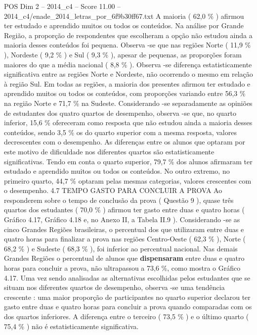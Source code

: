 \begin{textsample}{POS Dim 2 – 2014\_c4 – Score 11.00 – 2014\_c4/enade\_2014\_letras\_por\_6f9b30ff67.txt}
A maioria ( 62,0 \% ) afirmou ter estudado e aprendido muitos ou todos os conteúdos.
Na análise por Grande Região, a proporção de respondentes que escolheram a opção não estudou ainda a maioria desses conteúdos foi pequena.
Observa -se que nas regiões Norte ( 11,9 \% ), Nordeste ( 9,2 \% ) e Sul ( 9,3 \% ), apesar de pequenas, as proporções foram maiores do que a média nacional ( 8,8 \% ).
Observa -se diferença estatisticamente significativa entre as regiões Norte e Nordeste, não ocorrendo o mesmo em relação à região Sul.
Em todas as regiões, a maioria dos presentes afirmou ter estudado e aprendido muitos ou todos os conteúdos, com proporções variando entre 56,3 \% na região Norte e 71,7 \% na Sudeste.
Considerando -se separadamente as opiniões de estudantes dos quatro quartos de desempenho, observa -se que, no quarto inferior, 15,6 \% ofereceram como resposta que não estudou ainda a maioria desses conteúdos, sendo 3,5 \% os do quarto superior com a mesma resposta, valores decrescentes com o desempenho.
As diferenças entre os alunos que optaram por este motivo de dificuldade nos diferentes quartos são estatisticamente significativas.
Tendo em conta o quarto superior, 79,7 \% dos alunos afirmaram ter estudado e aprendido muitos ou todos os conteúdos.
No outro extremo, no primeiro quarto, 44,7 \% optaram pelas mesmas categorias, valores crescentes com o desempenho. 4.7 TEMPO GASTO PARA CONCLUIR A PROVA Ao responderem sobre o tempo de conclusão da prova ( Questão 9 ), quase três quartos dos estudantes ( 70,0 \% ) afirmou ter gasto entre duas e quatro horas ( Gráfico 4.17, Gráfico 4.18 e, no Anexo II, a Tabela II.9 ).
Considerando -se as cinco Grandes Regiões brasileiras, o percentual dos que utilizaram entre duas e quatro horas para finalizar a prova nas regiões Centro-Oeste ( 62,3 \% ), Norte ( 68,2 \% ) e Sudeste ( 68,3 \% ), foi inferior ao percentual nacional.
Nas demais Grandes Regiões o percentual de alunos que \textbf{dispensaram} entre duas e quatro horas para concluir a prova, não ultrapassou a 73,6 \%, como mostra o Gráfico 4.17.
Uma vez sendo analisadas as alternativas escolhidas pelos estudantes que se situam nos diferentes quartos de desempenho, observa -se uma tendência crescente : uma maior proporção de participantes no quarto superior declarou ter gasto entre duas e quatro horas para concluir a prova quando comparadas com os dos quartos inferiores.
A diferença entre o terceiro ( 73,5 \% ) e o último quarto ( 75,4 \% ) não é estatisticamente significativa.

\end{textsample}
